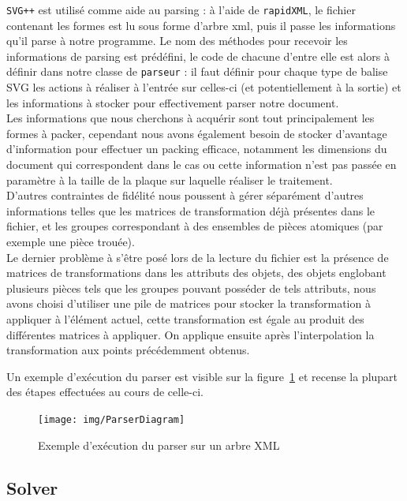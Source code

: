 \texttt{SVG++} est utilisé comme aide au parsing : à l'aide de \texttt{rapidXML}, le fichier contenant les formes est lu sous forme d'arbre xml, puis il passe les informations qu'il parse à notre programme. Le nom des méthodes pour recevoir les informations de parsing est prédéfini, le code de chacune d'entre elle est alors à définir dans notre classe de \texttt{parseur} : il faut définir pour chaque type de balise SVG les actions à réaliser à l'entrée sur celles-ci (et potentiellement à la sortie) et les informations à stocker pour effectivement parser notre document.\\

\indent Les informations que nous cherchons à acquérir sont tout principalement les formes à packer, cependant nous avons également besoin de stocker d'avantage d'information pour effectuer un packing efficace, notamment les dimensions du document qui correspondent dans le cas ou cette information n'est pas passée en paramètre à la taille de la plaque sur laquelle réaliser le traitement.\\

\indent D'autres contraintes de fidélité nous poussent à gérer séparément d'autres informations telles que les matrices de transformation déjà présentes dans le fichier, et les groupes correspondant à des ensembles de pièces atomiques (par exemple une pièce trouée).\\


\indent Le dernier problème à s'être posé lors de la lecture du fichier est la présence de matrices de transformations dans les attributs des objets, des objets englobant plusieurs pièces tels que les groupes pouvant posséder de tels attributs, nous avons choisi d'utiliser une pile de matrices pour stocker la transformation à appliquer à l'élément actuel, cette transformation est égale au produit des différentes matrices à appliquer. On applique ensuite après l'interpolation la transformation aux points précédemment obtenus.

Un exemple d'exécution du parser est visible sur la figure~\ref{la pomme de terre} et recense la plupart des étapes effectuées au cours de celle-ci.

\begin{figure}[htb!]
\center
\hspace*{-2.2cm}
\texttt{[image: img/ParserDiagram]}
\caption{Exemple d'exécution du parser sur un arbre XML}
\label{la pomme de terre}
\end{figure}
\newpage

\subsection{Solver}

